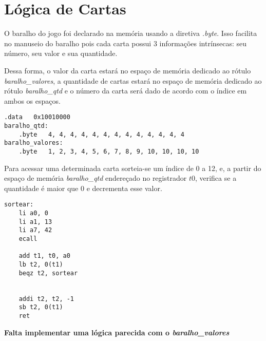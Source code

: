 \documentclass[ ]{article}
\begin{document}
	\section{Lógica de Cartas}
	O baralho do jogo foi declarado na memória usando a diretiva \textit{.byte}. Isso facilita no manuseio do baralho pois cada carta possui 3 informações intrínsecas: seu número, seu valor e sua quantidade. 
	
	Dessa forma, o valor da carta estará no espaço de memória dedicado ao rótulo \textit{baralho\_valores}, a quantidade de cartas estará no espaço de memória dedicado ao rótulo \textit{baralho\_qtd } e o número da carta será dado de acordo com o índice em ambos os espaços.
	
	
	\begin{lstlisting}
.data	0x10010000
baralho_qtd:
	.byte	4, 4, 4, 4, 4, 4, 4, 4, 4, 4, 4, 4, 4
baralho_valores:
	.byte	1, 2, 3, 4, 5, 6, 7, 8, 9, 10, 10, 10, 10
	\end{lstlisting}
	
	Para acessar uma determinada carta sorteia-se um índice de 0 a 12, e, a partir do espaço de memória \textit{baralho\_qtd} endereçado no registrador $t0$, verifica se a quantidade é maior que 0 e decrementa esse valor. 
	\begin{lstlisting}
sortear:
	li a0, 0
	li a1, 13
	li a7, 42
	ecall

	add t1, t0, a0
	lb t2, 0(t1) 
	beqz t2, sortear 
	

	addi t2, t2, -1
	sb t2, 0(t1) 
	ret
	\end{lstlisting}
	\textbf{Falta implementar uma lógica parecida com o \textit{baralho\_valores}}
\end{document}
